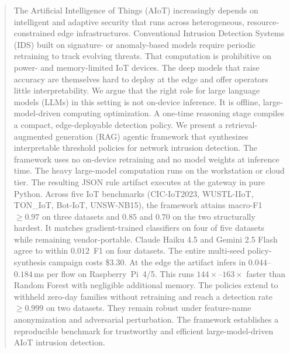 \begin{abstract}
The Artificial Intelligence of Things (AIoT) increasingly depends on intelligent and adaptive security that runs across heterogeneous, resource-constrained edge infrastructures. Conventional Intrusion Detection Systems (IDS) built on signature- or anomaly-based models require periodic retraining to track evolving threats. That computation is prohibitive on power- and memory-limited IoT devices. The deep models that raise accuracy are themselves hard to deploy at the edge and offer operators little interpretability. We argue that the right role for large language models (LLMs) in this setting is not on-device inference. It is offline, large-model-driven computing optimization. A one-time reasoning stage compiles a compact, edge-deployable detection policy. We present a retrieval-augmented generation (RAG) agentic framework that synthesizes interpretable threshold policies for network intrusion detection. The framework uses no on-device retraining and no model weights at inference time. The heavy large-model computation runs on the workstation or cloud tier. The resulting JSON rule artifact executes at the gateway in pure Python. Across five IoT benchmarks (CIC-IoT2023, WUSTL-IIoT, TON\_IoT, Bot-IoT, UNSW-NB15), the framework attains macro-F1 $\geq 0.97$ on three datasets and $0.85$ and $0.70$ on the two structurally hardest. It matches gradient-trained classifiers on four of five datasets while remaining vendor-portable. Claude Haiku 4.5 and Gemini 2.5 Flash agree to within $0.012$~F1 on four datasets. The entire multi-seed policy-synthesis campaign costs \$3.30. At the edge the artifact infers in $0.044$--$0.184$\,ms per flow on Raspberry~Pi~4/5. This runs $144\times$--$163\times$ faster than Random Forest with negligible additional memory. The policies extend to withheld zero-day families without retraining and reach a detection rate $\geq 0.999$ on two datasets. They remain robust under feature-name anonymization and adversarial perturbation. The framework establishes a reproducible benchmark for trustworthy and efficient large-model-driven AIoT intrusion detection.
\end{abstract}
